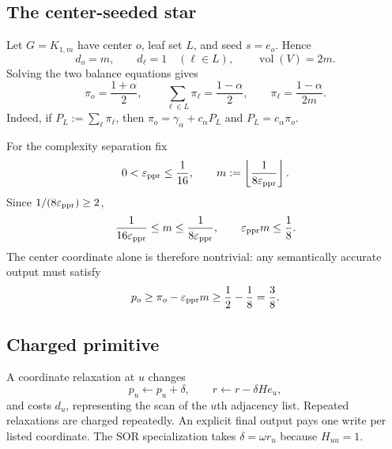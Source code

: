 \subsection{The center-seeded star}

Let $G=K_{1,m}$ have center $o$, leaf set $L$, and seed $s=e_o$.  Hence
\begin{equation}
  d_o=m,
  \qquad d_\ell=1\quad(\ell\in L),
  \qquad \operatorname{vol}(V)=2m.
  \label{eq:signed-star-degrees}
\end{equation}
Solving the two balance equations gives
\begin{equation}
  \pi_o=\frac{1+\alpha}{2},
  \qquad
  \sum_{\ell\in L}\pi_\ell=\frac{1-\alpha}{2},
  \qquad
  \pi_\ell=\frac{1-\alpha}{2m}.
  \label{eq:signed-star-ppr}
\end{equation}
Indeed, if $P_L:=\sum_\ell\pi_\ell$, then
$\pi_o=\gamma_\alpha+c_\alpha P_L$ and
$P_L=c_\alpha\pi_o$.

For the complexity separation fix
\begin{equation}
  0<\varepsilon_{\rm ppr}\le\frac1{16},
  \qquad
  m:=\left\lfloor\frac{1}{8\varepsilon_{\rm ppr}}\right\rfloor.
  \label{eq:signed-star-size}
\end{equation}
Since $1/(8\varepsilon_{\rm ppr})\ge2$,
\begin{equation}
  \frac{1}{16\varepsilon_{\rm ppr}}
  \le m\le
  \frac{1}{8\varepsilon_{\rm ppr}},
  \qquad
  \varepsilon_{\rm ppr}m\le\frac18.
  \label{eq:signed-star-size-bounds}
\end{equation}
The center coordinate alone is therefore nontrivial: any semantically
accurate output must satisfy
\begin{equation}
  p_o\ge\pi_o-\varepsilon_{\rm ppr}m
  \ge\frac12-\frac18=\frac38.
  \label{eq:signed-star-center-required}
\end{equation}

\subsection{Charged primitive}

A coordinate relaxation at $u$ changes
\begin{equation}
  p_u\leftarrow p_u+\delta,
  \qquad
  r\leftarrow r-\delta He_u,
  \label{eq:signed-star-coordinate-primitive}
\end{equation}
and costs $d_u$, representing the scan of the $u$th adjacency list.  Repeated
relaxations are charged repeatedly.  An explicit final output pays one write
per listed coordinate.  The SOR specialization takes
$\delta=\omega r_u$ because $H_{uu}=1$.
